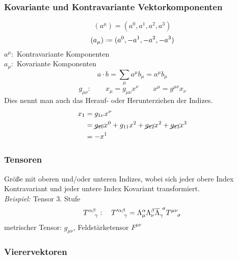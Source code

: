\subsubsection{Kovariante und Kontravariante Vektorkomponenten}

\begin{equation*}
(a^{\mu}) = (a^0, a^1, a^2, a^3)
\end{equation*}
\begin{equation*}
(a_{\mu}) \defeq (a^0, -a^1, -a^2, -a^3)
\end{equation*}
$ a^{\mu} : $ Kontravariante Komponenten\\
$ a_{\mu} : $ Kovariante Komponenten
\begin{equation*}
a \cdot b = \sum_{\mu} a^{\mu} b_{\mu} = a^{\mu} b_{\mu}
\end{equation*}
$$ g_{\mu \nu} : \qquad x_{\mu} = g_{\mu \nu} x^{\nu} \qquad x^{\mu} = g^{\mu \nu} x_{\nu} $$
Dies nennt man auch das Herauf- oder Herunterziehen der Indizes.
\begin{align*}
x_1 &= g_{1 \nu} x^\nu\\
&= \cancel{g_{10}}x^0 + g_{11} x^2 + \cancel{g_{12}}x^2 + \cancel{g_{13}}x^3\\
&= - x^1
\end{align*}

\subsubsection{Tensoren}

Größe mit oberen und/oder unteren Indizes, wobei sich jeder obere Index Kontravariant und jeder untere Index Kovariant transformiert.\\[5pt]
\emph{Beispiel:} Tensor 3. Stufe
$$ T^{\alpha \beta}_{\ \ \ \gamma} : \quad T'^{\alpha \beta}_{\ \ \ \: \gamma} = \Lambda^{\alpha}_{\mu} \Lambda^{\beta}_{\nu} \ol{\Lambda}_{\gamma} ^{\ \sigma} T^{\mu \nu}_{\ \ \ \sigma} $$
metrischer Tensor: $ g_{\mu \nu} $, Feldstärketensor $ F^{\mu \nu} $
%
%
%
%
%
%


\subsubsection{Vierervektoren}

